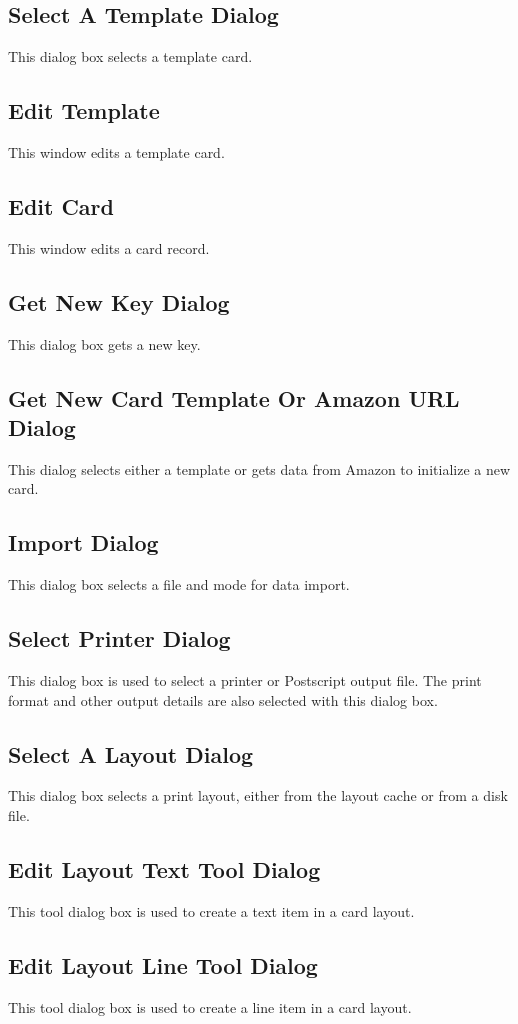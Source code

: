 \subsection{Select A Template Dialog}
This dialog box selects a template card.
\subsection{Edit Template}
This window edits a template card.
\subsection{Edit Card}
This window edits a card record.
\subsection{Get New Key Dialog}
This dialog box gets a new key.
\subsection{Get New Card Template Or Amazon URL Dialog}
This dialog selects either a template or gets data from Amazon to initialize 
a new card.
\subsection{Import Dialog}
This dialog box selects a file and mode for data import.
\subsection{Select Printer Dialog}
This dialog box is used to select a printer or Postscript output file.
The print format and other output details are also selected with this
dialog box.
\subsection{Select A Layout Dialog}
This dialog box selects a print layout, either from the layout cache or
from a disk file.
\subsection{Edit Layout Text Tool Dialog}
This tool dialog box is used to create a text item in a card layout.
\subsection{Edit Layout Line Tool Dialog}
This tool dialog box is used to create a line item in a card layout.
